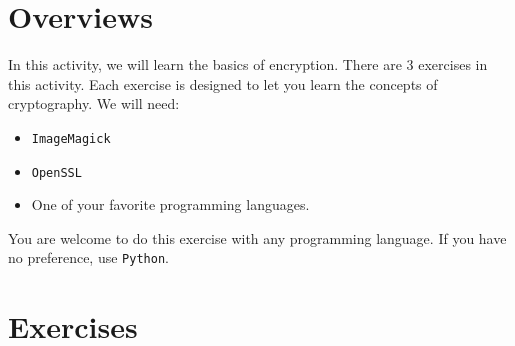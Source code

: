 \documentclass[a4paper, 10pt]{article}
\begin{document}
\subject
{}

\section*{Overviews}

\par \myspace[h] In this activity, we will learn the basics of encryption.
There are 3 exercises in this activity.
Each exercise is designed to let you learn the concepts of cryptography.
We will need:
\begin{itemize}
	\item \texttt{ImageMagick}
	\item \texttt{OpenSSL}
	\item One of your favorite programming languages.
\end{itemize}
You are welcome to do this exercise with any programming language.
If you have no preference, use \texttt{Python}.

\section*{Exercises}

\newcommand{\ManualCrackTime}{15 minutes}
\end{document}
